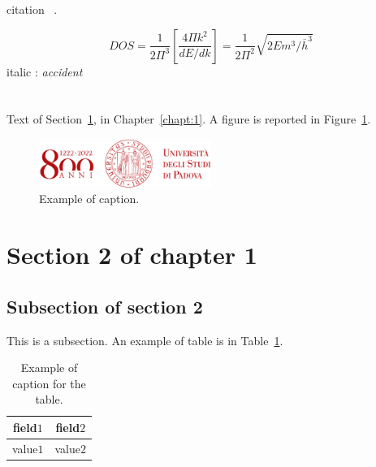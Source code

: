 citation
~\cite{ref1}.  

\begin{equation}
\label{eq4}
   DOS=\frac{1}{2\Pi^3 }\left[ \frac{4\Pi k^2}{dE/dk}\right]=\frac{1}{2\Pi^2 }  \sqrt{2Em^3/ \overline{h}^3}
\end{equation}
italic :
\textit{accident}




















\section{}\label{sect:1_1}  

Text of Section~\ref{sect:1_1}, in Chapter~\ref{chapt:1}. 
A figure is reported in Figure~\ref{fig:1}.

\begin{figure}[h!]
\centering
\includegraphics[width=0.5\textwidth]{figures/example.png}
\caption[Example of caption.]{Example of caption.\label{fig:1}}
\end{figure}

\section{Section 2 of chapter 1}\label{sect:1_2} 

\subsection{Subsection of section 2}\label{subsect:1_2_1} 
This is a subsection.
An example of table is in Table~\ref{tab:1}. 
\begin{table}
\centering
\begin{tabular}{c|c}
\toprule
field$1$ & field$2$ \\ \midrule
value$1$ & value$2$ \\
\bottomrule
\end{tabular}
\caption[Example of caption for the table.]{Example of caption for the table.}
\label{tab:1}
\end{table}






